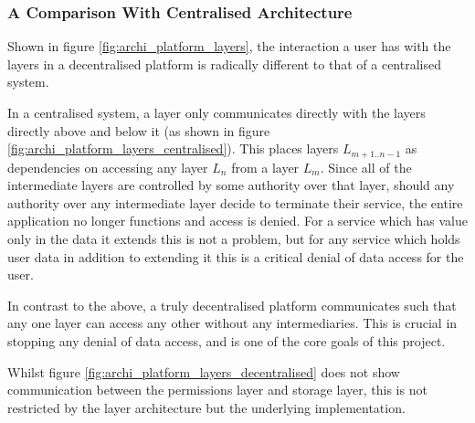 \subsubsection{A Comparison With Centralised Architecture}

Shown in figure \ref{fig:archi_platform_layers}, the interaction a user has with the layers in a decentralised platform is radically different to that of a centralised system.

In a centralised system, a layer only communicates directly with the layers directly above and below it (as shown in figure \ref{fig:archi_platform_layers_centralised}). This places layers $L_{m+1..n-1}$ as dependencies on accessing any layer $L_{n}$ from a layer $L_{m}$. Since all of the intermediate layers are controlled by some authority over that layer, should any authority over any intermediate layer decide to terminate their service, the entire application no longer functions and access is denied. For a service which has value only in the data it extends this is not a problem, but for any service which holds user data in addition to extending it this is a critical denial of data access for the user.



In contrast to the above, a truly decentralised platform communicates such that any one layer can access any other without any intermediaries. This is crucial in stopping any denial of data access, and is one of the core goals of this project.



Whilst figure \ref{fig:archi_platform_layers_decentralised} does not show communication between the permissions layer and storage layer, this is not restricted by the layer architecture but the underlying implementation.

